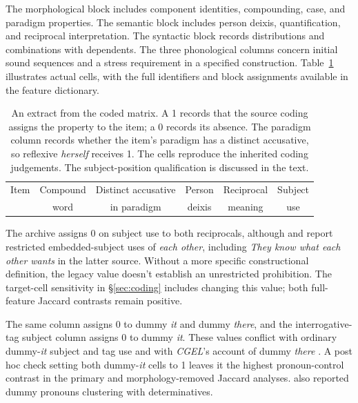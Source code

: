 \documentclass[12pt]{article}
\providecommand{\mention}[1]{\textit{#1}}
\begin{document}
The morphological block includes component identities, compounding, case, and paradigm properties. The semantic block includes person deixis, quantification, and reciprocal interpretation. The syntactic block records distributions and combinations with dependents. The three phonological columns concern initial sound sequences and a stress requirement in a specified construction. Table~\ref{tab:matrix} illustrates actual cells, with the full identifiers and block assignments available in the feature dictionary.

\begin{table}[htbp]
\centering\small
\setlength{\tabcolsep}{4pt}
\begin{tabular}{lccccc}
\toprule
Item & Compound & Distinct accusative & Person & Reciprocal & Subject \\
     & word & in paradigm & deixis & meaning & use \\
\midrule

\end{tabular}
\caption{An extract from the coded matrix. A 1 records that the source coding assigns the property to the item; a 0 records its absence. The paradigm column records whether the item's paradigm has a distinct accusative, so reflexive \mention{herself} receives 1. The cells reproduce the inherited coding judgements. The subject-position qualification is discussed in the text.}
\label{tab:matrix}
\end{table}
\FloatBarrier

The archive assigns 0 on subject use to both reciprocals, although \textcite{haas2007reciprocal} and \textcite{hurstNordlinger2011} report restricted embedded-subject uses of \mention{each other}, including \mention{They know what each other wants} in the latter source. Without a more specific constructional definition, the legacy value doesn't establish an unrestricted prohibition. The target-cell sensitivity in \S\ref{sec:coding} includes changing this value; both full-feature Jaccard contrasts remain positive.

The same column assigns 0 to dummy \mention{it} and dummy \mention{there}, and the interrogative-tag subject column assigns 0 to dummy \mention{it}. These values conflict with ordinary dummy-\mention{it} subject and tag use and with \textit{CGEL}'s account of dummy \mention{there} \citep[Ch.~5, \S10.1.1]{huddleston2002}. A post hoc check setting both dummy-\mention{it} cells to 1 leaves it the highest pronoun-control contrast in the primary and morphology-removed Jaccard analyses. \textcite[\S4]{reynolds2021} also reported dummy pronouns clustering with determinatives.
\end{document}
